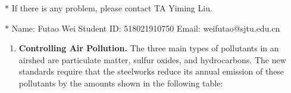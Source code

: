 \documentclass[12pt,a4paper]{article}
\theoremstyle{definition}
\begin{document}
\noindent

\noindent{}
\begin{center}
\footnotesize{\color{red}$*$ If there is any problem, please contact TA Yiming Liu. }

\footnotesize{\color{blue}$*$ Name: Futao Wei  \quad Student ID: 518021910750 \quad Email: weifutao@sjtu.edu.cn}
\end{center}
\begin{enumerate}

   \item 
   \textbf{Controlling Air Pollution. }The three main types of pollutants in an airshed are particulate matter, sulfur oxides, and hydrocarbons. The new standards require that the steelworks reduce its annual emission of these pollutants by the amounts shown in the following table: 
	\begin{table}[h]
		\footnotesize
		\centering
	    \label{standards}
	    \renewcommand\arraystretch{1.1}
		\begin{tabular}{lc}
			

\end{tabular}
\end{table}
\end{enumerate}
\end{document}
